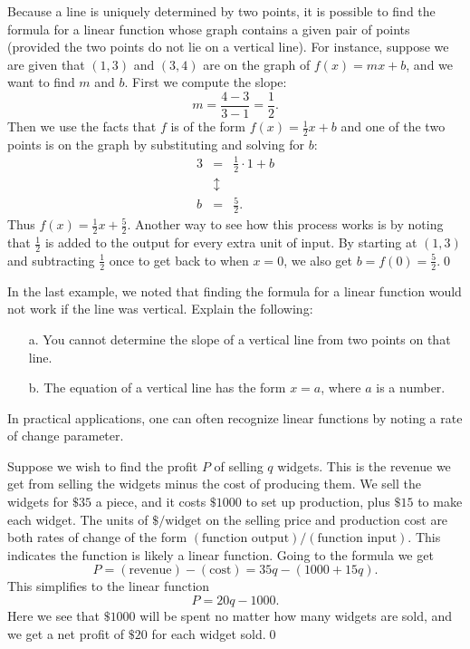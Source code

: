 \begin{eg} Because a line is uniquely determined by two points, it is possible to find the formula for a linear function whose graph contains a given pair of points (provided the two points do not lie on a vertical line). For instance, suppose we are given that $(1,3)$ and $(3,4)$ are on the graph of $f(x) = mx +b$, and we want to find $m$ and $b$. First we compute the slope:
\[
m = \frac{4-3}{3-1} = \frac{1}{2}.
\]
Then we use the facts that $f$ is of the form $f(x) = \frac{1}{2}x+b$ and one of the two points is on the graph by substituting and solving for $b$:
\begin{eqnarray*}
3 & = & \frac{1}{2}\cdot 1 + b\\
 & \updownarrow & \\
b & = & \frac{5}{2}.
\end{eqnarray*}
Thus $f(x) = \frac{1}{2}x + \frac{5}{2}$. Another way to see how this process works is by noting that $\frac{1}{2}$ is added to the output for every extra unit of input. By starting at $(1,3)$ and subtracting $\frac{1}{2}$ once to get back to when $x=0$, we also get $b=f(0)=\frac{5}{2}$.\qed \end{eg}

\pagebreak

\begin{question} In the last example, we noted that finding the formula for a linear function would not work if the line was vertical. Explain the following:
\begin{enumerate}
\item[a.] You cannot determine the slope of a vertical line from two points on that line.
\item[b.] The equation of a vertical line has the form $x=a$, where $a$ is a number.
\end{enumerate}
\end{question}

\par 

In practical applications, one can often recognize linear functions by noting a rate of change parameter.

\par

\begin{eg} Suppose we wish to find the profit $P$ of selling $q$ widgets. This is the revenue we get from selling the widgets minus the cost of producing them. We sell the widgets for $\$ 35$ a piece, and it costs $\$ 1000$ to set up production, plus $\$ 15$ to make each widget. The units of $\$ /\mbox{widget}$ on the selling price and production cost are both rates of change of the form $(\mbox{function output})/(\mbox{function input})$. This indicates the function is likely a linear function. Going to the formula we get
\[
P = (\mbox{revenue}) - (\mbox{cost}) = 35q - (1000 + 15q).
\]
This simplifies to the linear function
\[
P = 20q - 1000.
\]
Here we see that $\$ 1000$ will be spent no matter how many widgets are sold, and we get a net profit of $\$ 20$ for each widget sold.\qed \end{eg}

